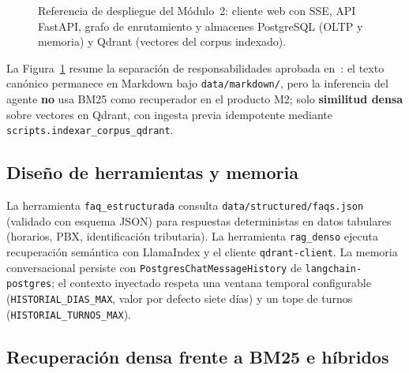 \documentclass[conference]{IEEEtran}
\newcommand{\code}[1]{\texttt{\small #1}}
\begin{document}
\begin{figure}[ht]
\centering
{}
\caption{Referencia de despliegue del Módulo~2: cliente web con SSE, API
FastAPI, grafo de enrutamiento y almacenes PostgreSQL (OLTP y memoria) y
Qdrant (vectores del corpus indexado).}
\label{fig:m2_arq}
\end{figure}

La Figura~\ref{fig:m2_arq} resume la separación de responsabilidades
aprobada en~\cite{decision3m2}: el texto canónico permanece en Markdown bajo
\code{data/markdown/}, pero la inferencia del agente \textbf{no} usa BM25
como recuperador en el producto M2; solo \textbf{similitud densa} sobre
vectores en Qdrant, con ingesta previa idempotente mediante
\code{scripts.indexar\_corpus\_qdrant}.

\subsection{Diseño de herramientas y memoria}

La herramienta \code{faq\_estructurada} consulta \code{data/structured/faqs.json}
(validado con esquema JSON) para respuestas deterministas en datos
tabulares (horarios, PBX, identificación tributaria). La herramienta
\code{rag\_denso} ejecuta recuperación semántica con LlamaIndex y el cliente
\texttt{qdrant-client}. La memoria conversacional persiste con
\texttt{PostgresChatMessageHistory} de \texttt{langchain-postgres}; el
contexto inyectado respeta una ventana temporal configurable
(\code{HISTORIAL\_DIAS\_MAX}, valor por defecto siete días) y un tope de
turnos (\code{HISTORIAL\_TURNOS\_MAX}).

\subsection{Recuperación densa frente a BM25 e híbridos}
\end{document}
